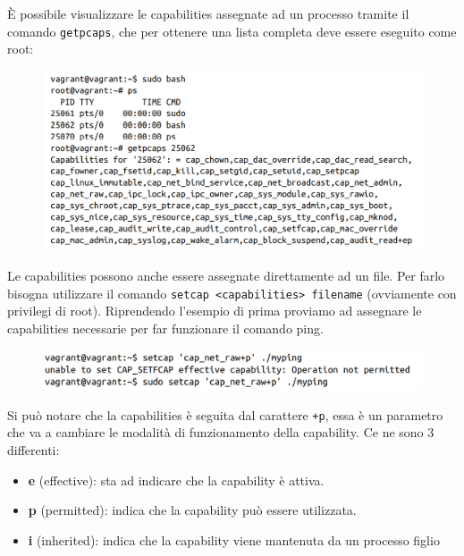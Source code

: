 È possibile visualizzare le capabilities assegnate ad un processo tramite il comando
\verb|getpcaps|, che per ottenere una lista completa deve essere eseguito come root:

\begin{figure}[H]
    \centering
    \includegraphics[width=\textwidth, keepaspectratio]{capitoli/os_security/imgs/cap1.png}
\end{figure}

Le capabilities possono anche essere assegnate direttamente ad un file.
Per farlo bisogna utilizzare il comando \verb|setcap <capabilities> filename|
(ovviamente con privilegi di root). Riprendendo l'esempio di prima proviamo ad
assegnare le capabilities necessarie per far funzionare il comando ping.

\begin{figure}[H]
    \centering
    \includegraphics[width=\textwidth, keepaspectratio]{capitoli/os_security/imgs/cap2.png}
\end{figure}

Si può notare che la capabilities  è seguita dal carattere \verb|+p|, essa è un
parametro che va a cambiare le modalità di funzionamento della capability.
Ce ne sono 3 differenti:

\begin{itemize}
    \item \textbf{e} (effective): sta ad indicare che la capability è attiva.
    \item \textbf{p} (permitted): indica che la capability può essere utilizzata.
    \item \textbf{i} (inherited): indica che la capability viene mantenuta
          da un processo figlio
\end{itemize}

